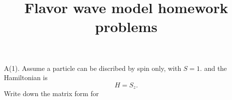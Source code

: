 \documentclass[letter]{article}
\title{{\myfont Flavor wave model homework problems}}
\begin{document}
\maketitle
A(1). Assume a particle can be discribed by spin only, with $S=1$. and the Hamiltonian is 
$$ H= S_z.
$$
Write down the matrix form for 
\end{document}
